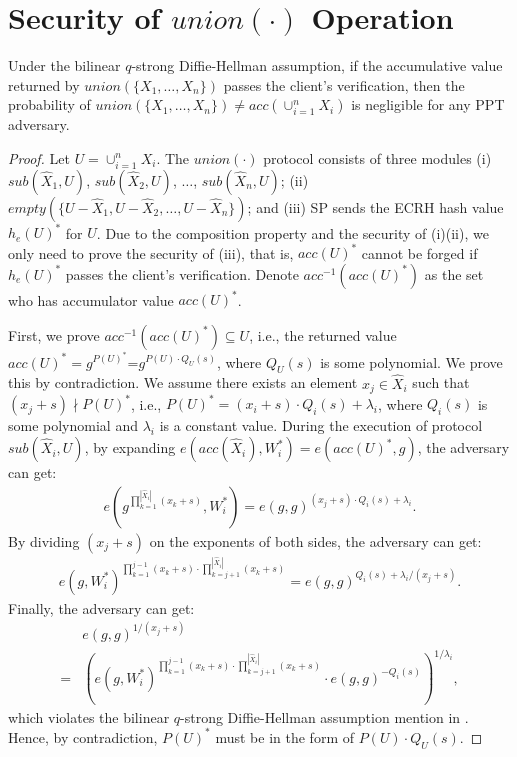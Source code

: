 \section{Security of $union(\cdot)$ Operation}

\begin{lemma}\label{lem:aggregate-queries:union}
  Under the bilinear $q$-strong Diffie-Hellman assumption, if the accumulative value returned by $union(\{X_1,\dots,X_n\})$ passes the client's verification, then the probability of $union(\{X_1,\dots,X_n\}) \neq acc(\cup_{i=1}^n X_i)$ is negligible for any PPT adversary.
\end{lemma}
\begin{proof}
  Let $U = \cup_{i=1}^nX_i$. The $union(\cdot)$ protocol consists of three modules (i) $sub(\widehat{X}_1, U)$, $sub(\widehat{X}_2, U)$, $\dots$, $sub(\widehat{X}_n, U)$; (ii) $empty(\{U-\widehat{X}_1, U-\widehat{X}_2, \dots, U -\widehat{X}_n\})$; and (iii) SP sends the ECRH hash value $h_e(U)^*$ for $U$. Due to the composition property and the security of (i)(ii), we only need to prove the security of (iii), that is, $acc(U)^*$ cannot be forged if $h_e(U)^*$ passes the client's verification. Denote $acc^{-1}({acc(U)}^*)$ as the set who has accumulator value ${acc(U)}^*$.

  First, we prove $acc^{-1}(acc(U)^*)\subseteq U$, i.e., the returned value $acc(U)^*=g^{P(U)^*}$=$g^{P(U) \cdot Q_U(s)}$, where $Q_U(s)$ is some polynomial. We prove this by contradiction.
  We assume there exists an element $x_j \in \widehat{X}_i$ such that $(x_j + s) \nmid P(U)^*$, i.e., $P(U)^* = (x_i + s) \cdot Q_i(s) + \lambda_i$, where $Q_i(s)$ is some polynomial and $\lambda_i$ is a constant value. During the execution of protocol $sub(\widehat{X}_i, U)$, by expanding $e(acc(\widehat{X}_i), W_i^*) = e(acc(U)^*, g)$, the adversary can get:
  \begin{align*}
  e(g^{\prod_{k=1}^{|\widehat{X}_i|}(x_k+s) }, W_i^*)  = e(g, g)^{(x_j+s) \cdot Q_i(s) + \lambda_i}.
  \end{align*}
  By dividing $(x_j+s)$ on the exponents of both sides, the adversary can get:
  \begin{align*}
  e(g, W_i^*)^{\prod_{k=1}^{j-1}{(x_k+s)} \cdot \prod_{k=j+1}^{|\widehat{X}_i|}{(x_k+s)}} = e (g, g)^{Q_i(s) + \lambda_i/(x_j+s)}.
  \end{align*}
  Finally, the adversary can get:
  \begin{align}
&e(g, g)^{1/(x_j + s)}  \nonumber \\
    = &(e(g, W_i^*)^{\prod_{k=1}^{j-1}(x_k+s) \cdot \prod_{k=j+1}^{|\widehat{X}_i|}{(x_k+s)}} \cdot e(g, g)^{-Q_i(s)})^{1/\lambda_i},\nonumber
  \end{align}
  which violates the bilinear $q$-strong Diffie-Hellman assumption mention in . Hence, by contradiction, $P(U)^*$ must be in the form of $P(U) \cdot Q_U(s)$.


\end{proof}
